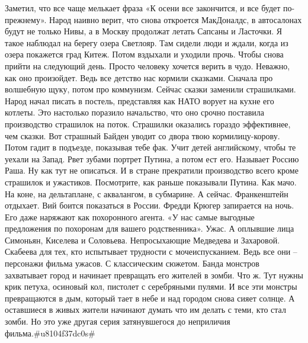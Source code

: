 Заметил, что все чаще мелькает фраза «К осени все закончится, и все будет по-прежнему». Народ наивно верит, что снова откроется МакДоналдс, в автосалонах будут не только Нивы, а в Москву продолжат летать Сапсаны и Ласточки.
Я такое наблюдал на берегу озера Светлояр. Там сидели люди и ждали, когда из озера покажется град Китеж. Потом вздыхали и уходили прочь. Чтобы снова прийти на следующий день. Просто человеку хочется верить в чудо. Неважно, как оно произойдет. Ведь все детство нас кормили сказками. Сначала про волшебную щуку, потом про коммунизм. Сейчас сказки заменили страшилками. Народ начал писать в постель, представляя как НАТО ворует на кухне его котлеты.
Это настолько поразило начальство, что оно срочно поставила производство страшилок на поток. Страшилки оказались гораздо эффективнее, чем сказки. Вот страшный Байден уводит со двора твою кормилицу-корову. Потом гадит в подъезде, показывая тебе фак. Учит детей английскому, чтобы те уехали на Запад. Рвет зубами портрет Путина, а потом ест его. Называет Россию Раша. Ну как тут не описаться.
И в стране прекратили производство всего кроме страшилок и ужастиков. Посмотрите, как раньше показывали Путина. Как мачо. На коне, на дельтаплане, с аквалангом, в субмарине. А сейчас. Франкенштейн отдыхает. Вий боится показаться в России. Фредди Крюгер запирается на ночь. Его даже наряжают как похоронного агента. «У нас самые выгодные предложения по похоронам для вашего родственника». Ужас.
А оплывшие лица Симоньян, Киселева и Соловьева. Непросыхающие Медведева и Захаровой. Скабеева для тех, кто испытывает трудности с мочеиспусканием. Ведь все они – персонажи фильма ужасов.
С классическим сюжетом. Банда монстров захватывает город и начинает превращать его жителей в зомби.
Что ж. Тут нужны крик петуха, осиновый кол, пистолет с серебряными пулями. И все эти монстры превращаются в дым, который тает в небе и над городом снова сияет солнце. А оставшиеся в живых жители начинают думать что им делать с теми, кто стал зомби. Но это уже другая серия затянувшегося до неприличия фильма.#u8104f37dc0s#
